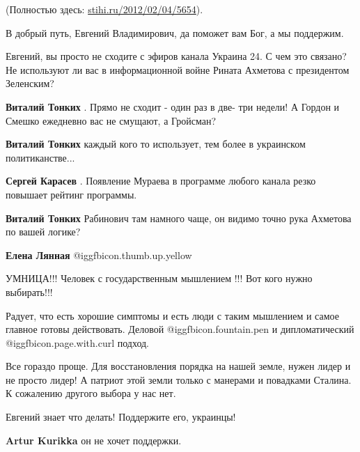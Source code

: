 \begin{itemize}
(Полностью здесь: \url{stihi.ru/2012/02/04/5654}).

В добрый путь, Евгений Владимирович, да поможет вам Бог, а мы поддержим.


Евгений, вы просто не сходите с эфиров канала Украина 24.  С чем это связано?
Не используют ли вас в информационной войне Рината Ахметова с президентом
Зеленским?

\begin{itemize} %
\textbf{Виталий Тонких} . Прямо не сходит - один раз в две- три недели! А Гордон и Смешко ежедневно вас не смущают, а Гройсман?

\textbf{Виталий Тонких} каждый кого то использует, тем более в украинском политиканстве...

\textbf{Сергей Карасев} . Появление Мураева в программе любого канала резко повышает рейтинг программы.

\textbf{Виталий Тонких} Рабинович там намного чаще, он видимо точно рука Ахметова по вашей логике?

\textbf{Елена Лянная}  @igg{fbicon.thumb.up.yellow} 
\end{itemize} %

УМНИЦА!!! Человек с государственным мышлением !!! Вот кого нужно выбирать!!!


Радует, что есть хорошие симптомы и есть люди с таким мышлением и самое главное
готовы действовать. Деловой @igg{fbicon.fountain.pen}  и дипломатический
@igg{fbicon.page.with.curl}  подход.


Все гораздо проще. Для восстановления порядка на нашей земле, нужен лидер и не
просто лидер! А патриот этой земли только с манерами и повадками Сталина. К
сожалению другого выбора у нас нет.


Евгений знает что делать! Поддержите его, украинцы!

\begin{itemize} %
\textbf{Artur Kurikka} он не хочет поддержки.
\end{itemize} %


\end{itemize}
